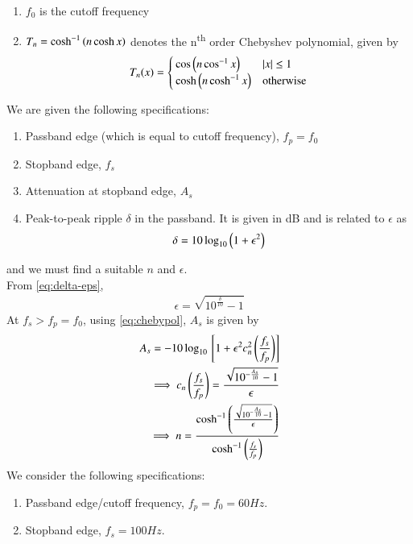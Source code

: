 \documentclass[journal,12pt,twocolumn]{IEEEtran}
\renewcommand\thesection{\arabic{section}}
\begin{document}
\begin{enumerate}[label=\thesection.\arabic*
		,ref=\thesection.\theenumi]
\begin{enumerate}
			\item $f_0$ is the cutoff frequency 
			\item $T_n = \cosh^{-1}\left(n\cosh{x}\right)$ denotes 
			the n\textsuperscript{th} order Chebyshev polynomial,
			given by
			\begin{align}
				T_n(x) =
				\begin{cases}
					\cos\left(n\cos^{-1}x\right) & \left\vert x\right\vert \le 1 \\
					\cosh\left(n\cosh^{-1}x\right) & \textrm{otherwise}
				\end{cases}
				\label{eq:chebypol}
			\end{align}
		\end{enumerate}
		We are given the following specifications:
		\begin{enumerate}
			\item Passband edge (which is equal to 
			cutoff frequency), $f_p = f_0$
			\item Stopband edge, $f_s$
			\item Attenuation at stopband edge, $A_s$
			\item Peak-to-peak ripple $\delta$ in the passband.
			It is given in dB and is related to $\epsilon$ as
			\begin{align}
				\delta = 10\log_{10}\left(1 + \epsilon^2\right)
				\label{eq:delta-eps}
			\end{align}
		\end{enumerate}
		and we must find a suitable $n$ and $\epsilon$.\\
		From \eqref{eq:delta-eps},
		\begin{align}
			\epsilon = \sqrt{10^{\frac{\delta}{10}} - 1}
			\label{eq:epsilon-del}
		\end{align}
		At $f_s > f_p = f_0$, using \eqref{eq:chebypol}, $A_s$ is given by
		\begin{align}
			A_s = -10\log_{10}{}\left[1 + \epsilon^2c_n^2\left(\frac{f_s}{f_p}\right)\right] \\
			\implies c_n\left(\frac{f_s}{f_p}\right) = \frac{\sqrt{10^{-\frac{A_s}{10}} - 1}}{\epsilon} \\
			\implies n = \frac{\cosh^{-1}\left(\frac{\sqrt{10^{-\frac{A_s}{10}} - 1}}{\epsilon}\right)}
			{\cosh^{-1}\left(\frac{f_s}{f_p}\right)}
		\end{align}
		We consider the following specifications:
		\begin{enumerate}
			\item Passband edge/cutoff frequency, $f_p = f_0 = {60}{Hz}$.
			\item Stopband edge, $f_s = {100}{Hz}$.

\end{enumerate}
\end{enumerate}
\end{document}
